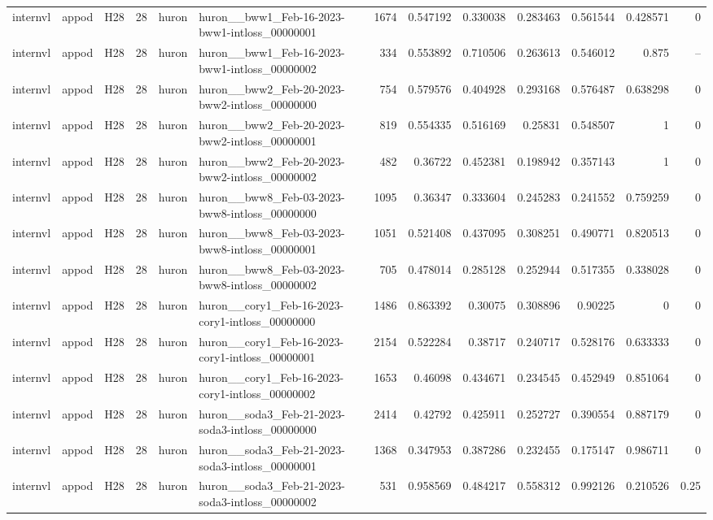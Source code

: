 \begin{longtable}{lllrllrrrrrrr}
internvl & appod & H28 & 28 & huron & huron\_\_bww1\_Feb-16-2023-bww1-intloss\_00000001 & 1674 & 0.547192 & 0.330038 & 0.283463 & 0.561544 & 0.428571 & 0 \\
internvl & appod & H28 & 28 & huron & huron\_\_bww1\_Feb-16-2023-bww1-intloss\_00000002 & 334 & 0.553892 & 0.710506 & 0.263613 & 0.546012 & 0.875 & -- \\
internvl & appod & H28 & 28 & huron & huron\_\_bww2\_Feb-20-2023-bww2-intloss\_00000000 & 754 & 0.579576 & 0.404928 & 0.293168 & 0.576487 & 0.638298 & 0 \\
internvl & appod & H28 & 28 & huron & huron\_\_bww2\_Feb-20-2023-bww2-intloss\_00000001 & 819 & 0.554335 & 0.516169 & 0.25831 & 0.548507 & 1 & 0 \\
internvl & appod & H28 & 28 & huron & huron\_\_bww2\_Feb-20-2023-bww2-intloss\_00000002 & 482 & 0.36722 & 0.452381 & 0.198942 & 0.357143 & 1 & 0 \\
internvl & appod & H28 & 28 & huron & huron\_\_bww8\_Feb-03-2023-bww8-intloss\_00000000 & 1095 & 0.36347 & 0.333604 & 0.245283 & 0.241552 & 0.759259 & 0 \\
internvl & appod & H28 & 28 & huron & huron\_\_bww8\_Feb-03-2023-bww8-intloss\_00000001 & 1051 & 0.521408 & 0.437095 & 0.308251 & 0.490771 & 0.820513 & 0 \\
internvl & appod & H28 & 28 & huron & huron\_\_bww8\_Feb-03-2023-bww8-intloss\_00000002 & 705 & 0.478014 & 0.285128 & 0.252944 & 0.517355 & 0.338028 & 0 \\
internvl & appod & H28 & 28 & huron & huron\_\_cory1\_Feb-16-2023-cory1-intloss\_00000000 & 1486 & 0.863392 & 0.30075 & 0.308896 & 0.90225 & 0 & 0 \\
internvl & appod & H28 & 28 & huron & huron\_\_cory1\_Feb-16-2023-cory1-intloss\_00000001 & 2154 & 0.522284 & 0.38717 & 0.240717 & 0.528176 & 0.633333 & 0 \\
internvl & appod & H28 & 28 & huron & huron\_\_cory1\_Feb-16-2023-cory1-intloss\_00000002 & 1653 & 0.46098 & 0.434671 & 0.234545 & 0.452949 & 0.851064 & 0 \\
internvl & appod & H28 & 28 & huron & huron\_\_soda3\_Feb-21-2023-soda3-intloss\_00000000 & 2414 & 0.42792 & 0.425911 & 0.252727 & 0.390554 & 0.887179 & 0 \\
internvl & appod & H28 & 28 & huron & huron\_\_soda3\_Feb-21-2023-soda3-intloss\_00000001 & 1368 & 0.347953 & 0.387286 & 0.232455 & 0.175147 & 0.986711 & 0 \\
internvl & appod & H28 & 28 & huron & huron\_\_soda3\_Feb-21-2023-soda3-intloss\_00000002 & 531 & 0.958569 & 0.484217 & 0.558312 & 0.992126 & 0.210526 & 0.25 \\

\end{longtable}

